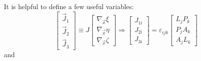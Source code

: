 It is helpful to define a few useful variables: 
\[\left[ {\begin{array}{*{20}{c}}
{{{\vec J}_1}}\\
{{{\vec J}_2}}\\
{{{\vec J}_3}}
\end{array}} \right] \equiv J\left[ {\begin{array}{*{20}{c}}
{{\nabla _{\vec x}}\xi }\\
{{\nabla _{\vec x}}\eta }\\
{{\nabla _{\vec x}}\zeta }
\end{array}} \right] \Rightarrow \left[ {\begin{array}{*{20}{c}}
{{J_{1i}}}\\
{{J_{2i}}}\\
{{J_{3i}}}
\end{array}} \right] = {\varepsilon _{ijk}}\left[ {\begin{array}{*{20}{c}}
{{L_j}{P_k}}\\
{{P_j}{A_k}}\\
{{A_j}{L_k}}
\end{array}} \right]\]
and
